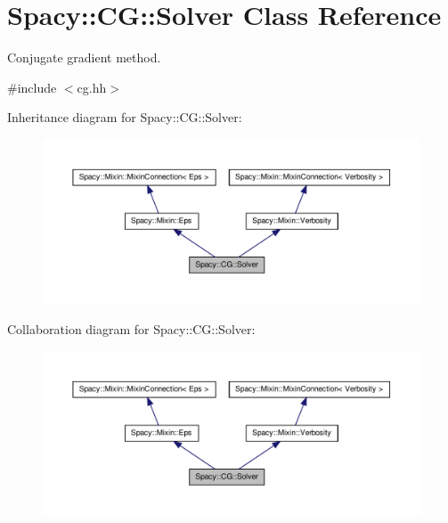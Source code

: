 \hypertarget{classSpacy_1_1CG_1_1Solver}{\section{\-Spacy\-:\-:\-C\-G\-:\-:\-Solver \-Class \-Reference}
\label{classSpacy_1_1CG_1_1Solver}
}


\-Conjugate gradient method.  




{\ttfamily \#include $<$cg.\-hh$>$}



\-Inheritance diagram for \-Spacy\-:\-:\-C\-G\-:\-:\-Solver\-:
\nopagebreak
\begin{figure}[H]
\begin{center}
\leavevmode
\includegraphics[width=350pt]{classSpacy_1_1CG_1_1Solver__inherit__graph}
\end{center}
\end{figure}


\-Collaboration diagram for \-Spacy\-:\-:\-C\-G\-:\-:\-Solver\-:
\nopagebreak
\begin{figure}[H]
\begin{center}
\leavevmode
\includegraphics[width=350pt]{classSpacy_1_1CG_1_1Solver__coll__graph}
\end{center}
\end{figure}
